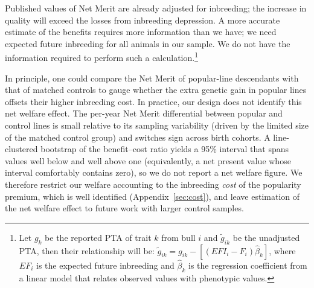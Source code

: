 \documentclass[12pt,letterpaper]{article}
\begin{document}
Published values of Net Merit are already adjusted for inbreeding; the increase in quality will exceed the losses from inbreeding depression. A more accurate estimate of the benefits requires more information than we have; we need expected future inbreeding for all animals in our sample. We do not have the information required to perform such a calculation.\footnote{Let $g_{k}$ be the reported PTA of trait $k$ from bull $i$ and $\tilde{g}_{ik}$ be the unadjusted PTA, then their relationship will be: $\tilde{g}_{ik}=g_{ik}-\left[(EFI_{i}-F_{i})\hat{\beta}_{k}\right]$, where $EF_{i}$ is the expected future inbreeding and $\hat{\beta}_{k}$ is the regression coefficient from a linear model that relates observed values with phenotypic values.} 

In principle, one could compare the Net Merit of popular-line descendants with that of matched controls to gauge whether the extra genetic gain in popular lines offsets their higher inbreeding cost. In practice, our design does not identify this net welfare effect. The per-year Net Merit differential between popular and control lines is small relative to its sampling variability (driven by the limited size of the matched control group) and switches sign across birth cohorts. A line-clustered bootstrap of the benefit--cost ratio yields a 95\% interval that spans values well below and well above one (equivalently, a net present value whose interval comfortably contains zero), so we do not report a net welfare figure. We therefore restrict our welfare accounting to the inbreeding \emph{cost} of the popularity premium, which is well identified (Appendix~\ref{sec:cost}), and leave estimation of the net welfare effect to future work with larger control samples.



\end{document}
